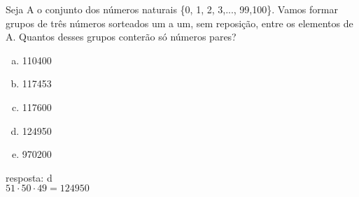 \begin{ex}
 Seja A o conjunto dos números naturais \{0, 1, 2, 3,..., 99,100\}. Vamos formar grupos de três números sorteados um a um, sem reposição, entre os elementos de A. Quantos desses grupos conterão só números pares?  
    \begin{enumerate}[(a)]
    \item 110400
    \item 117453
    \item 117600
    \item 124950
    \item 970200
    \end{enumerate}
      \begin{sol}
        resposta: d \\
        $ 51 \cdot 50 \cdot 49 = 124950$
      \end{sol}
\end{ex}